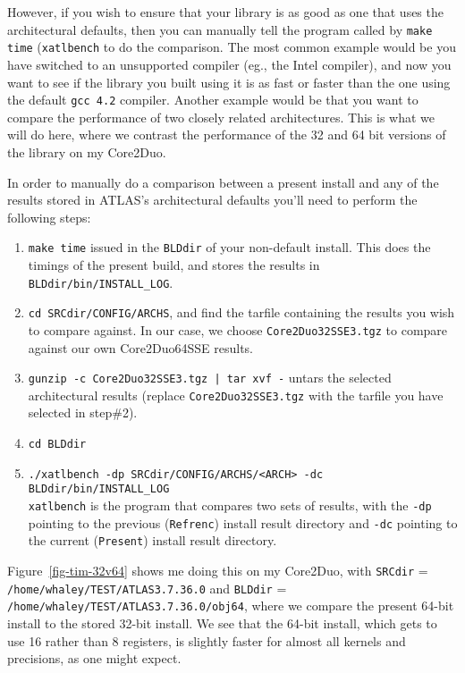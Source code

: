 \documentclass[11pt]{article}
\begin{document}
However, if you wish to ensure that your library is as good as one that
uses the architectural defaults, then you can manually tell the program
called by {\tt make time} ({\tt xatlbench} to do the comparison.  The most
common example would
be you have switched to an unsupported compiler (eg., the Intel compiler),
and now you want to see if the library you built using it is as fast or faster
than the one using the default {\tt gcc 4.2} compiler.  Another example would
be that you want to compare the performance of two closely related
architectures.  This is what we will do here, where we contrast the performance
of the 32 and 64 bit versions of the library on my Core2Duo.

In order to manually do a comparison between a present install and any of
the results stored in ATLAS's architectural defaults you'll need to
perform the following steps:
\begin{enumerate}
\item  {\tt make time} issued in the {\tt BLDdir} of your non-default install.
       This does the timings of the present build, and stores the results
       in {\tt BLDdir/bin/INSTALL\_LOG}.
\item {\tt cd SRCdir/CONFIG/ARCHS}, and find the tarfile containing the
      results you wish to compare against.  In our case, we choose
      {\tt Core2Duo32SSE3.tgz} to compare against our own Core2Duo64SSE
      results.
\item {\tt gunzip -c Core2Duo32SSE3.tgz | tar xvf -} untars the
      selected architectural results (replace {\tt Core2Duo32SSE3.tgz} with the
      tarfile you have selected in step\#2).
\item {\tt cd BLDdir}
\item \verb|./xatlbench -dp SRCdir/CONFIG/ARCHS/<ARCH> -dc BLDdir/bin/INSTALL_LOG|  \\
    {\tt xatlbench} is the program that compares two sets of results, with
    the {\tt -dp} pointing to the previous ({\tt Refrenc}) install result
    directory and {\tt -dc} pointing to the current ({\tt Present})
    install result directory.
\end{enumerate}

Figure~\ref{fig-tim-32v64} shows me doing this on my Core2Duo, with 
{\tt SRCdir} = {\tt /home/whaley/TEST/ATLAS3.7.36.0} and
{\tt BLDdir} = {\tt /home/whaley/TEST/ATLAS3.7.36.0/obj64}, where we compare
the present 64-bit install to the stored 32-bit install.
We see that the 64-bit install, which gets to use 16 rather than 8 registers,
is slightly faster for almost all kernels and precisions, as one might expect.
\end{document}
